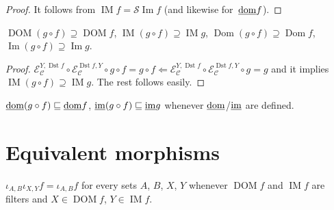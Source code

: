 \begin{proof}
It follows from $\operatorname{IM}f=\mathscr{S}\operatorname{Im}f$
(and likewise for~$\underline{\operatorname{dom}}f$).
\end{proof}

\begin{thm}
$\operatorname{DOM} (g \circ f) \supseteq \operatorname{DOM} f$, $\operatorname{IM} (g \circ f)
\supseteq \operatorname{IM} g$, $\operatorname{Dom} (g \circ f) \supseteq \operatorname{Dom} f$,
$\operatorname{Im} (g \circ f) \supseteq \operatorname{Im} g$.
\end{thm}

\begin{proof}
$\mathcal{E}_{\mathcal{C}}^{Y, \operatorname{Dst} f} \circ
\mathcal{E}_{\mathcal{C}}^{\operatorname{Dst} f, Y} \circ g \circ f = g \circ f
\Leftarrow \mathcal{E}_{\mathcal{C}}^{Y, \operatorname{Dst} f} \circ
\mathcal{E}_{\mathcal{C}}^{\operatorname{Dst} f, Y} \circ g = g$ and it implies
$\operatorname{IM} (g \circ f) \supseteq \operatorname{IM} g$. The rest follows easily.
\end{proof}

\begin{cor}
$\underline{\operatorname{dom}}(g \circ f) \sqsubseteq \underline{\operatorname{dom}}f$, $\underline{\operatorname{im}} (g \circ f)
\sqsubseteq \underline{\operatorname{im}}g$ whenever $\underline{\operatorname{dom}}$/$\underline{\operatorname{im}}$ are defined.
\end{cor}

\section{Equivalent morphisms}

\begin{prop}\label{two-iotas}
  $\iota_{A, B} \iota_{X, Y} f = \iota_{A, B} f$ for every sets $A$, $B$, $X$,
  $Y$ whenever $\operatorname{DOM} f$ and $\operatorname{IM} f$ are filters and $X \in
  \operatorname{DOM} f$, $Y \in \operatorname{IM} f$.
\end{prop}


